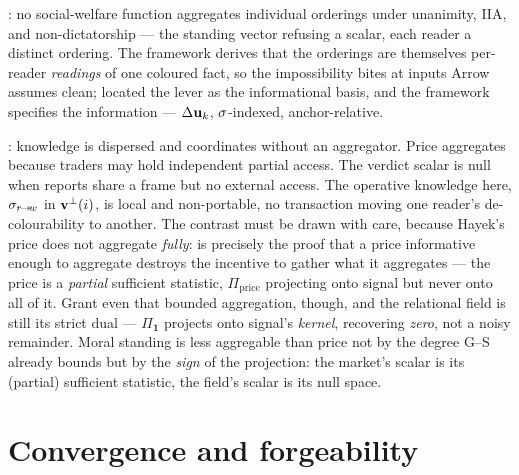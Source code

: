\documentclass[../main]{subfiles}
\begin{document}
\begin{econ}[label=e:arrow, title={Impossibility, biting at the inputs}, ref=pr:agg,
  cites={a:arrow,a:sensocialchoice}, departs=scalar,
  stopsat={no SWF aggregates orderings; here the orderings are per-reader readings of one coloured fact, so the impossibility bites at inputs Arrow assumes clean}]
  \textcite{a:arrow}: no social-welfare function aggregates individual orderings under
  unanimity, IIA, and non-dictatorship --- the standing vector refusing a scalar, each reader
  a distinct ordering. The framework derives that the orderings are themselves per-reader
  \emph{readings} of one coloured fact, so the impossibility bites at inputs Arrow assumes
  clean; \textcite{a:sensocialchoice} located the lever as the informational basis, and the
  framework specifies the information --- $\Delta\mathbf{u}\sb{k}$, $\sigma$-indexed, anchor-relative.
\end{econ}

\begin{econ}[label=e:hayek, title={Less aggregable than price}, ref=pr:agg,
  cites={a:hayek}, departs=scalar,
  stopsat={price is a (partial) sufficient statistic; the field's scalar is its null space --- duality of sign, not of degree}]
  \textcite{a:hayek}: knowledge is dispersed and coordinates without an aggregator. Price
  aggregates because traders may hold independent partial access. The verdict scalar is null
  when reports share a frame but no external access. The operative knowledge here,
  $\sigma\sb{ r\!\to\!w }$ in $\mathbf{v}\sp{\perp}(i)$, is local and non-portable, no transaction moving one
  reader's de-colourability to another. The contrast must be drawn with care, because Hayek's
  price does not aggregate \emph{fully}:
  \textcite{a:grossmanstiglitz} is precisely the proof that a price informative enough to
  aggregate destroys the incentive to gather what it aggregates --- the price is a
  \emph{partial} sufficient statistic, $\Pi_{\text{price}}$ projecting onto signal but never
  onto all of it. Grant even that bounded aggregation, though, and the relational field is
  still its strict dual --- $\Pi_{\mathbf 1}$ projects onto signal's \emph{kernel}, recovering
  \emph{zero}, not a noisy remainder. Moral standing is less aggregable than price not by the
  degree G--S already bounds but by the \emph{sign} of the projection: the market's scalar is
  its (partial) sufficient statistic, the field's scalar is its null space.
\end{econ}

\clearpage
\section{Convergence and forgeability}
\label{sec:convergence}
\end{document}
